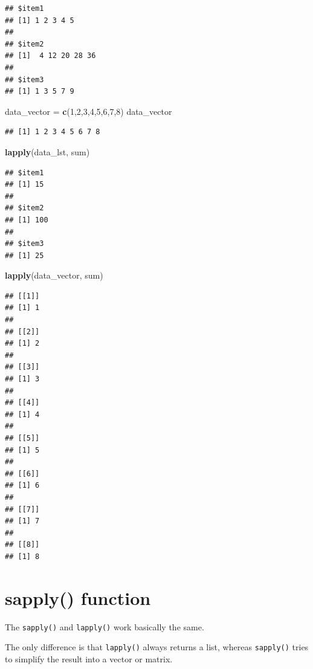 \documentclass[
]{book}
\newenvironment{Shaded}{\begin{snugshade}}{\end{snugshade}}
\newcommand{\DecValTok}[1]{\textcolor[rgb]{0.00,0.00,0.81}{#1}}
\newcommand{\KeywordTok}[1]{\textcolor[rgb]{0.13,0.29,0.53}{\textbf{#1}}}
\newcommand{\NormalTok}[1]{#1}
\newcommand{\StringTok}[1]{\textcolor[rgb]{0.31,0.60,0.02}{#1}}
\begin{document}
\begin{verbatim}
## $item1
## [1] 1 2 3 4 5
## 
## $item2
## [1]  4 12 20 28 36
## 
## $item3
## [1] 1 3 5 7 9
\end{verbatim}

\begin{Shaded}
\begin{Highlighting}[]
\NormalTok{data_vector =}\StringTok{ }\KeywordTok{c}\NormalTok{(}\DecValTok{1}\NormalTok{,}\DecValTok{2}\NormalTok{,}\DecValTok{3}\NormalTok{,}\DecValTok{4}\NormalTok{,}\DecValTok{5}\NormalTok{,}\DecValTok{6}\NormalTok{,}\DecValTok{7}\NormalTok{,}\DecValTok{8}\NormalTok{)}
\NormalTok{data_vector}
\end{Highlighting}
\end{Shaded}

\begin{verbatim}
## [1] 1 2 3 4 5 6 7 8
\end{verbatim}

\begin{Shaded}
\begin{Highlighting}[]
\KeywordTok{lapply}\NormalTok{(data_lst, sum)}
\end{Highlighting}
\end{Shaded}

\begin{verbatim}
## $item1
## [1] 15
## 
## $item2
## [1] 100
## 
## $item3
## [1] 25
\end{verbatim}

\begin{Shaded}
\begin{Highlighting}[]
\KeywordTok{lapply}\NormalTok{(data_vector, sum)}
\end{Highlighting}
\end{Shaded}

\begin{verbatim}
## [[1]]
## [1] 1
## 
## [[2]]
## [1] 2
## 
## [[3]]
## [1] 3
## 
## [[4]]
## [1] 4
## 
## [[5]]
## [1] 5
## 
## [[6]]
## [1] 6
## 
## [[7]]
## [1] 7
## 
## [[8]]
## [1] 8
\end{verbatim}

\hypertarget{sapply-function}{%
\section{sapply() function}\label{sapply-function}}

The \texttt{sapply()} and \texttt{lapply()} work basically the same.

The only difference is that \texttt{lapply()} always returns a list, whereas \texttt{sapply()} tries to simplify the result into a vector or matrix.
\end{document}
